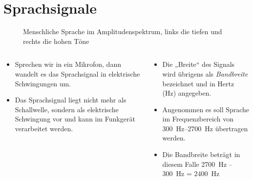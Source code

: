 
\section{Sprachsignale}
\label{section:sprachsignale}
\begin{frame}%

\begin{figure}
    \caption{\scriptsize Menschliche Sprache im Amplitudenspektrum, links die tiefen und rechts die hohen Töne}
    \label{n_sprachspektrum}
\end{figure}

\end{frame}

\begin{frame}
\begin{columns}
    \begin{column}{0.48\textwidth}
    \begin{itemize}
  \item Sprechen wir in ein Mikrofon, dann wandelt es das Sprachsignal in elektrische Schwingungen um.
  \item Das Sprachsignal liegt nicht mehr als Schallwelle, sondern als elektrische Schwingung vor und kann im Funkgerät verarbeitet werden.
  \end{itemize}

    \end{column}
    \pause
    
   \begin{column}{0.48\textwidth}
       \begin{itemize}
  \item Die „Breite“ des Signals wird übrigens als \emph{Bandbreite} bezeichnet und in Hertz (Hz) angegeben.
  \item Angenommen es soll Sprache im Frequenzbereich von \qtyrange{300}{2700}{\hertz} übertragen werden.
  \item Die Bandbreite beträgt in diesem Falle \qty{2700}{\hertz} – \qty{300}{\hertz} = \qty{2400}{\hertz}
  \end{itemize}

   \end{column}
\end{columns}



\end{frame}

\begin{frame}
\end{frame}%
